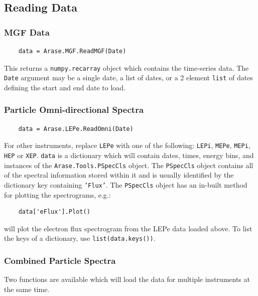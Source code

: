 	\subsection{Reading Data}
	
	\subsubsection{MGF Data}
	
	\begin{verbatim}
	data = Arase.MGF.ReadMGF(Date)
	\end{verbatim}
	
	This returns a \texttt{numpy.recarray} object which contains the time-series data. The \texttt{Date} argument may be a single date, a list of dates, or a 2 element \texttt{list} of dates defining the start and end date to load.
	
	\subsubsection{Particle Omni-directional Spectra}
	
	\begin{verbatim}
	data = Arase.LEPe.ReadOmni(Date)
	\end{verbatim}
	
	For other instruments, replace \texttt{LEPe} with one of the following: \texttt{LEPi}, \texttt{MEPe}, \texttt{MEPi}, \texttt{HEP} or \texttt{XEP}. \texttt{data} is a dictionary which will contain dates, times, energy bins, and instances of the \texttt{Arase.Tools.PSpecCls} object. The \texttt{PSpecCls} object contains all of the spectral information stored within it and is usually identified by the dictionary key containing \texttt{'Flux'}. The \texttt{PSpecCls} object has an in-built method for plotting the spectrograms, e.g.:
	\begin{verbatim}
	data['eFlux'].Plot()
	\end{verbatim}
	will plot the electron flux spectrogram from the LEPe data loaded above. To list the keys of a dictionary, use \texttt{list(data.keys())}.
	
	\subsubsection{Combined Particle Spectra}
	
	Two functions are available which will load the data for multiple instruments at the same time.
	

